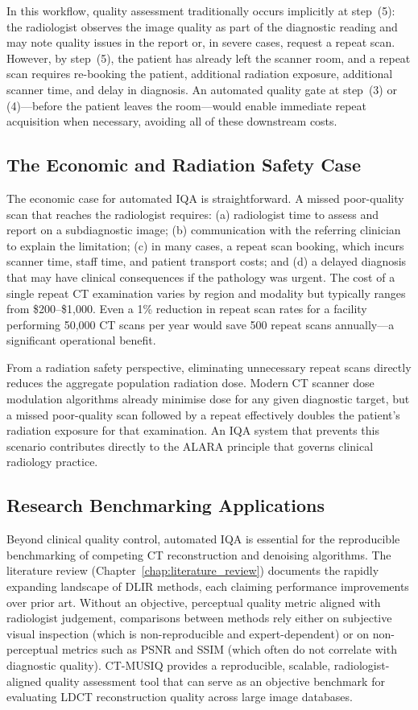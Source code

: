 In this workflow, quality assessment traditionally occurs implicitly at step~(5): the
radiologist observes the image quality as part of the diagnostic reading and may note
quality issues in the report or, in severe cases, request a repeat scan. However, by
step~(5), the patient has already left the scanner room, and a repeat scan requires
re-booking the patient, additional radiation exposure, additional scanner time, and
delay in diagnosis. An automated quality gate at step~(3) or (4)---before the patient
leaves the room---would enable immediate repeat acquisition when necessary, avoiding
all of these downstream costs.

\subsection{The Economic and Radiation Safety Case}

The economic case for automated IQA is straightforward. A missed poor-quality scan that
reaches the radiologist requires: (a) radiologist time to assess and report on a
subdiagnostic image; (b) communication with the referring clinician to explain the
limitation; (c) in many cases, a repeat scan booking, which incurs scanner time,
staff time, and patient transport costs; and (d) a delayed diagnosis that may have
clinical consequences if the pathology was urgent. The cost of a single repeat CT
examination varies by region and modality but typically ranges from \$200--\$1,000.
Even a 1\% reduction in repeat scan rates for a facility performing 50,000 CT scans
per year would save 500 repeat scans annually---a significant operational benefit.

From a radiation safety perspective, eliminating unnecessary repeat scans directly
reduces the aggregate population radiation dose. Modern CT scanner dose modulation
algorithms already minimise dose for any given diagnostic target, but a missed
poor-quality scan followed by a repeat effectively doubles the patient's radiation
exposure for that examination. An IQA system that prevents this scenario contributes
directly to the ALARA principle that governs clinical radiology practice.

\subsection{Research Benchmarking Applications}

Beyond clinical quality control, automated IQA is essential for the reproducible
benchmarking of competing CT reconstruction and denoising algorithms. The literature
review (Chapter~\ref{chap:literature_review}) documents the rapidly expanding landscape
of DLIR methods, each claiming performance improvements over prior art. Without an
objective, perceptual quality metric aligned with radiologist judgement, comparisons
between methods rely either on subjective visual inspection (which is non-reproducible
and expert-dependent) or on non-perceptual metrics such as PSNR and SSIM (which often
do not correlate with diagnostic quality). CT-MUSIQ provides a reproducible, scalable,
radiologist-aligned quality assessment tool that can serve as an objective benchmark
for evaluating LDCT reconstruction quality across large image databases.
